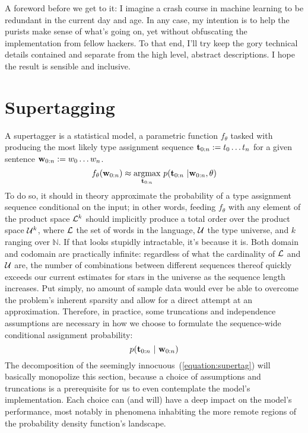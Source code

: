 A foreword before we get to it: I imagine a crash course in machine learning to be redundant in the current day and age.
In any case, my intention is to help the purists make sense of what's going on, yet without obfuscating the implementation from fellow hackers.
To that end, I'll try keep the gory technical details contained and separate from the high level, abstract descriptions.
I hope the result is sensible and inclusive.

\section{Supertagging}
\label{section:supertagging}
A supertagger is a statistical model, a parametric function $f_\theta$ tasked with producing the most likely type assignment sequence $\mathbf{t}_{0:n} := t_0 \dots t_n$ for a given sentence $\mathbf{w}_{0:n} := w_0 \dots w_n$.
\begin{equation}
	f_\theta(\mathbf{w}_{0:n}) \approx \underset{\mathbf{t}_{0:n}}{\mathrm{argmax}} ~ p(\mathbf{t}_{0:n} \ | \mathbf{w}_{0:n}, \theta)
\end{equation}
To do so, it should in theory approximate the probability of a type assignment sequence conditional on the input; in other words, feeding $f_\theta$ with any element of the product space $\mathcal{L}^k$ should implicitly produce a total order over the product space $\mathcal{U}^{k}$, where $\mathcal{L}$ the set of words in the language, $\mathcal{U}$ the type universe, and $k$ ranging over $\mathbb{N}$.
If that looks stupidly intractable, it's because it is.
Both domain and codomain are practically infinite: regardless of what the cardinality of $\mathcal{L}$ and $\mathcal{U}$ are, the number of combinations between different sequences thereof quickly exceeds our current estimates for stars in the universe as the sequence length increases.
Put simply, no amount of sample data would ever be able to overcome the problem's inherent sparsity and allow for a direct attempt at an approximation.
Therefore, in practice, some truncations and independence assumptions are necessary in how we choose to formulate the sequence-wide conditional assignment probability:
\begin{equation}\label{equation:supertag}
p(\mathbf{t}_{0:n} \ | \ \mathbf{w}_{0:n})
\end{equation}
The decomposition of the seemingly innocuous~(\ref{equation:supertag}) will basically monopolize this section, because a choice of assumptions and truncations is a prerequisite for us to even contemplate the model's implementation.
Each choice can (and will) have a deep impact on the model's performance, most notably in phenomena inhabiting the more remote regions of the probability density function's landscape.
